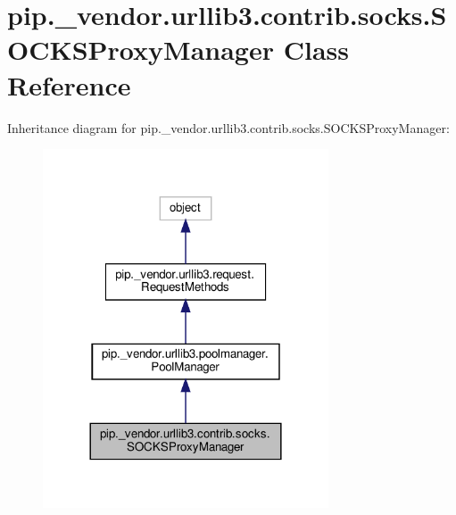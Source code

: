 \hypertarget{classpip_1_1__vendor_1_1urllib3_1_1contrib_1_1socks_1_1SOCKSProxyManager}{}\section{pip.\+\_\+vendor.\+urllib3.\+contrib.\+socks.\+S\+O\+C\+K\+S\+Proxy\+Manager Class Reference}
\label{classpip_1_1__vendor_1_1urllib3_1_1contrib_1_1socks_1_1SOCKSProxyManager}


Inheritance diagram for pip.\+\_\+vendor.\+urllib3.\+contrib.\+socks.\+S\+O\+C\+K\+S\+Proxy\+Manager\+:
\nopagebreak
\begin{figure}[H]
\begin{center}
\leavevmode
\includegraphics[width=240pt]{classpip_1_1__vendor_1_1urllib3_1_1contrib_1_1socks_1_1SOCKSProxyManager__inherit__graph}
\end{center}
\end{figure}


